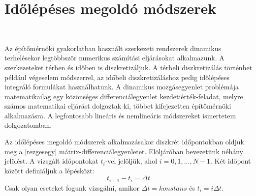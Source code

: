 \chapter{Időlépéses megoldó módszerek}\label{chap:idolep_tan} 

{\ }

Az építőmérnöki gyakorlatban használt szerkezeti rendszerek dinamikus terhelésekor  legtöbbször numerikus számítási eljárásokat alkalmazunk. A szerkezeteket térben és időben is diszkretizáljuk. A térbeli diszkretizálás történhet például végeselem módszerrel, az időbeli diszkretizáláshoz pedig időlépéses integráló formulákat használhatunk.  A dinamikus mozgásegyenlet problémája matematikailag egy közönséges differenciálegyenlet kezdetiérték-feladat, melyre számos matematikai eljárást dolgoztak ki, többet kifejezetten építőmérnöki alkalmazásra. A legfontosabb lineáris és nemlineáris módszereket ismertetem dolgozatomban. 

Az időlépéses megoldó módszerek alkalmazásakor diszkrét időpontokban oldjuk meg a \eqref{rezgesegy} mátrix-differenciálegyenletet. Elöljáróban bevezetünk néhány jelölést. A vizsgált időpontokat $t_i$-vel jelöljük, ahol $i = 0,1,...,N-1$. Két időpont között definiáljuk  a lépésközt:
%
\begin{equation*}
t_{i+1}-t_i  = \Delta{t}  
\end{equation*}
Csak olyan eseteket fogunk vizsgálni, amikor $\Delta{t} = konstans$ és $t_i = i\Delta{t}$.

